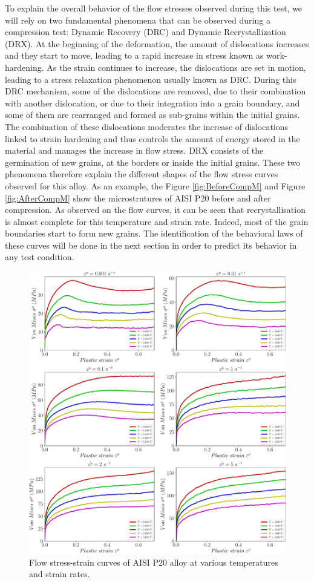 \documentclass[twoside,english,1p,final,sort&compress]{elsarticle}
\theoremstyle{plain}
\begin{document}
To explain the overall behavior of the flow stresses observed during this test, we will rely on two fundamental phenomena that can be observed during a compression test: Dynamic Recovery (DRC) and Dynamic Recrystallization (DRX). At the beginning of the deformation, the amount of dislocations increases and they start to move, leading to a rapid increase in stress known as work-hardening. As the strain continues to increase, the dislocations are set in motion, leading to a stress relaxation phenomenon usually known as DRC. During this DRC mechanism, some of the dislocations are removed, due to their combination with another dislocation, or due to their integration into a grain boundary, and some of them are rearranged and formed as sub-grains within the initial grains. The combination of these dislocations moderates the increase of dislocations linked to strain hardening and thus controls the amount of energy stored in the material and manages the increase in flow stress. DRX consists of the germination of new grains, at the borders or inside the initial grains. These two phenomena therefore explain the different shapes of the flow stress curves observed for this alloy. As an example, the Figure \ref{fig:BeforeCompM} and Figure \ref{fig:AfterCompM} show the microstrutures of AISI P20 before and after compression. As observed on the flow curves, it can be seen that recrystallisation is almost complete for this temperature and strain rate. Indeed, most of the grain boundaries start to form new grains. The identification of the behavioral laws of these curves will be done in the next section in order to predict its behavior in any test condition.
\begin{figure}[!ht]
\centering
\includegraphics[width=1.02\columnwidth]
{newFigures/rawData}
\caption{Flow stress-strain curves of AISI P20 alloy at various temperatures and strain rates.}
\label{fig:rawData}
\end{figure}
\end{document}
